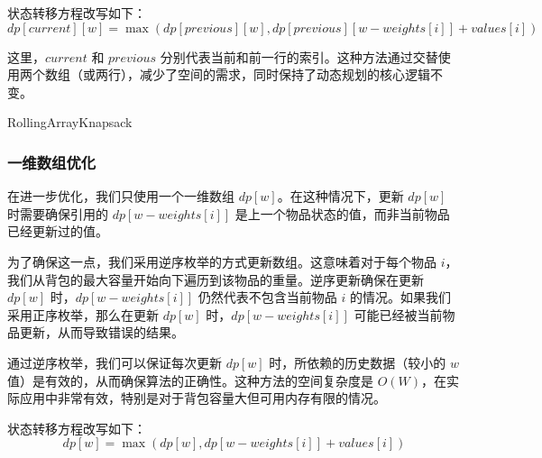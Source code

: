 \documentclass[UTF8,titlepage]{ctexart}
\numberwithin{figure}{section}
\begin{document}
状态转移方程改写如下：
\begin{equation}
    dp[current][w] = \max(dp[previous][w], dp[previous][w-weights[i]] + values[i])
\end{equation}

这里，$current$ 和 $previous$ 分别代表当前和前一行的索引。这种方法通过交替使用两个数组（或两行），减少了空间的需求，同时保持了动态规划的核心逻辑不变。

\begin{algorithm}[H]
    \SetAlgoLined
    \DontPrintSemicolon
    \caption{RollingArrayKnapsack}
    \end{algorithm}

\subsubsection{一维数组优化}
在进一步优化，我们只使用一个一维数组 $dp[w]$。在这种情况下，更新 $dp[w]$ 时需要确保引用的 $dp[w-weights[i]]$ 是上一个物品状态的值，而非当前物品已经更新过的值。

为了确保这一点，我们采用逆序枚举的方式更新数组。这意味着对于每个物品 $i$，我们从背包的最大容量开始向下遍历到该物品的重量。逆序更新确保在更新 $dp[w]$ 时，$dp[w-weights[i]]$ 仍然代表不包含当前物品 $i$ 的情况。如果我们采用正序枚举，那么在更新 $dp[w]$ 时，$dp[w-weights[i]]$ 可能已经被当前物品更新，从而导致错误的结果。

通过逆序枚举，我们可以保证每次更新 $dp[w]$ 时，所依赖的历史数据（较小的 $w$ 值）是有效的，从而确保算法的正确性。这种方法的空间复杂度是 \(O(W)\)，在实际应用中非常有效，特别是对于背包容量大但可用内存有限的情况。

状态转移方程改写如下：
\begin{equation}
    dp[w] = \max(dp[w], dp[w-weights[i]] + values[i])
\end{equation}
\end{document}
